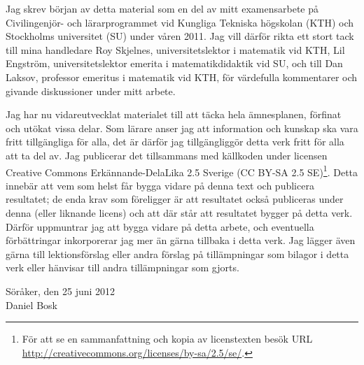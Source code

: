 Jag skrev början av detta material som en del av mitt examensarbete på
Civilingenjör- och lärarprogrammet vid Kungliga Tekniska högskolan (KTH) och
Stockholms universitet (SU) under våren 2011.
Jag vill därför rikta ett stort tack till mina handledare
Roy Skjelnes, universitetslektor i matematik vid KTH,
Lil Engström, universitetslektor emerita i matematikdidaktik vid SU, och
till Dan Laksov, professor emeritus i matematik vid KTH,
för värdefulla kommentarer och givande diskussioner under mitt arbete.

Jag har nu vidareutvecklat materialet till att täcka hela ämnesplanen, förfinat 
och utökat vissa delar.
Som lärare anser jag att information och kunskap ska vara fritt tillgängliga 
för alla, det är därför jag tillgängliggör detta verk fritt för alla att ta del 
av.
Jag publicerar det tillsammans med källkoden under licensen Creative Commons 
Erkännande-DelaLika 2.5 Sverige (CC BY-SA 2.5 SE)\footnote{%
  För att se en sammanfattning och kopia av licenstexten besök URL 
  \url{http://creativecommons.org/licenses/by-sa/2.5/se/}.
}.
Detta innebär att vem som helst får bygga vidare på denna text och publicera 
resultatet; de enda krav som föreligger är att resultatet också publiceras 
under denna (eller liknande licens) och att där står att resultatet bygger på 
detta verk.
Därför uppmuntrar jag att bygga vidare på detta arbete, och eventuella 
förbättringar inkorporerar jag mer än gärna tillbaka i detta verk.
Jag lägger även gärna till lektionsförslag eller andra förslag på tillämpningar 
som bilagor i detta verk eller hänvisar till andra tillämpningar som gjorts.

\vspace{2cm}
\begin{flushright}
  \parbox{0.5\textwidth}{
    Söråker, den 25 juni 2012\\
    \vspace{10pt}%
    Daniel Bosk
  }
\end{flushright}
